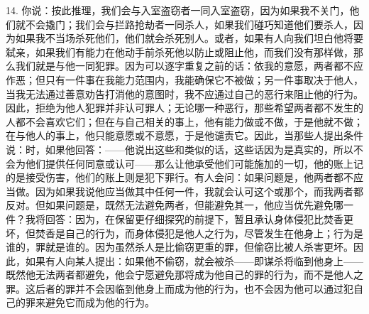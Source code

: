 14. 你说：按此推理，我们会与入室盗窃者一同入室盗窃，因为如果我不关门，他们就不会撬门；我们会与拦路抢劫者一同杀人，如果我们碰巧知道他们要杀人，因为如果我不当场杀死他们，他们就会杀死别人。或者，如果有人向我们坦白他将要弑亲，如果我们有能力在他动手前杀死他以防止或阻止他，而我们没有那样做，那么我们就是与他一同犯罪。因为可以逐字重复之前的话：依我的意愿，两者都不应作恶；但只有一件事在我能力范围内，我能确保它不被做；另一件事取决于他人，当我无法通过善意劝告打消他的意图时，我不应通过自己的恶行来阻止他的行为。因此，拒绝为他人犯罪并非认可罪人；无论哪一种恶行，那些希望两者都不发生的人都不会喜欢它们；但在与自己相关的事上，他有能力做或不做，于是他就不做；在与他人的事上，他只能意愿或不意愿，于是他谴责它。因此，当那些人提出条件说：时，如果他回答：——他说出这些和类似的话，这些话因为是真实的，所以不会为他们提供任何同意或认可——那么让他承受他们可能施加的一切，他的账上记的是接受伤害，他们的账上则是犯下罪行。有人会问：如果问题是，他两者都不应当做。因为如果我说他应当做其中任何一件，我就会认可这个或那个，而我两者都反对。但如果问题是，既然无法避免两者，但能避免其一，他应当优先避免哪一件？我将回答：因为，在保留更仔细探究的前提下，暂且承认身体侵犯比焚香更坏，但焚香是自己的行为，而身体侵犯是他人之行为，尽管发生在他身上；行为是谁的，罪就是谁的。因为虽然杀人是比偷窃更重的罪，但偷窃比被人杀害更坏。因此，如果有人向某人提出：如果他不偷窃，就会被杀——即谋杀将临到他身上——既然他无法两者都避免，他会宁愿避免那将成为他自己的罪的行为，而不是他人之罪。这后者的罪并不会因临到他身上而成为他的行为，也不会因为他可以通过犯自己的罪来避免它而成为他的行为。\par

